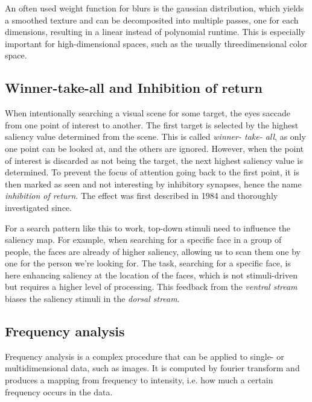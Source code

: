 \documentclass[a4paper,12pt,fleqn,oneside]{scrartcl}
\begin{document}
An often used weight function for blurs is the gaussian distribution, which yields a smoothed texture and can be
decomposited into multiple passes, one for each dimensions, resulting in a linear instead of polynomial runtime. This is
especially important for high-dimensional spaces, such as the usually threedimensional color space.

\subsection{Winner-take-all and Inhibition of return}

When intentionally searching a visual scene for some target, the eyes saccade from one point of interest to another. The
first target is selected by the highest  saliency value determined from the scene. This is called \emph{winner- take-
all}\cite{klein2008}, as only one point can be looked at, and the others are ignored. However, when the point of
interest is discarded as not being the target, the next highest saliency value is determined. To prevent the focus of
attention going back to the first  point, it is then marked as seen and not interesting by inhibitory synapses, hence
the name \emph{inhibition of return}. The effect was first described in 1984 and thoroughly investigated
since\cite{klein2000}.

For a search pattern like this to work, top-down stimuli need to influence the  saliency map. For example, when
searching for a specific face in a group of people,  the faces are already of higher saliency, allowing us to scan them
one by one for the person we're looking for. The task, searching for a specific face, is here enhancing saliency at the
location of the faces, which is not stimuli-driven but requires a higher level of processing.  This feedback from the
\emph{ventral stream} biases the  saliency stimuli in the \emph{dorsal stream}.



\subsection{Frequency analysis}

Frequency analysis is a complex procedure that can be applied to single- or multidimensional data, such as images. It
is computed by fourier transform and produces a mapping from frequency to intensity, i.e. how much a certain frequency
occurs in the data.
\end{document}
